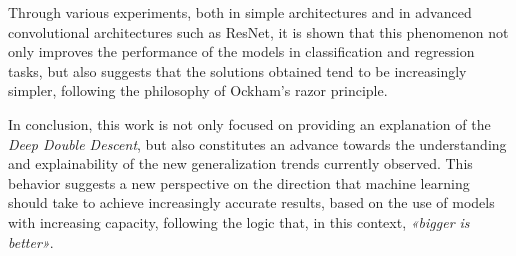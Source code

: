 Through various experiments, both in simple architectures and in advanced convolutional architectures such as ResNet, it is shown that this phenomenon not only improves the performance of the models in classification and regression tasks, but also suggests that the solutions obtained tend to be increasingly simpler, following the philosophy of Ockham's razor principle.

In conclusion, this work is not only focused on providing an explanation of the \emph{Deep Double Descent}, but also constitutes an advance towards the understanding and explainability of the new generalization trends currently observed. This behavior suggests a new perspective on the direction that machine learning should take to achieve increasingly accurate results, based on the use of models with increasing capacity, following the logic that, in this context, \emph{«bigger is better»}.

\clearpage
\thispagestyle{empty}
\mbox{}
\newpage
\endinput
